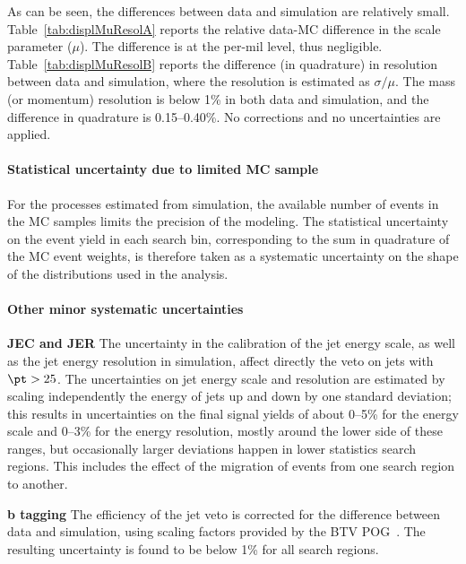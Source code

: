 As can be seen, the differences between data and simulation are
relatively small. Table~\ref{tab:displMuResolA} reports the relative
data-MC difference in the scale parameter ($\mu$). The difference is
at the per-mil level, thus negligible.
Table~\ref{tab:displMuResolB} reports the difference (in quadrature) in
resolution between data and simulation, where the resolution is
estimated as $\sigma/\mu$. The mass (or momentum) resolution is below
1\% in both data and simulation, and the difference in quadrature is
0.15--0.40\%. No corrections and no uncertainties are applied.

\paragraph{Statistical uncertainty due to limited MC sample}
For the processes estimated from simulation, the available number of
events in the MC samples limits the precision of the modeling.
The statistical uncertainty on the event yield in each search bin,
corresponding to the sum in quadrature of the MC event weights, is
therefore taken as a systematic uncertainty on the shape of the
distributions used in the analysis.



\paragraph{Other minor systematic uncertainties}
\textbf{JEC and JER}
The uncertainty in the calibration of the jet energy scale, as well
as the jet energy resolution in simulation, affect directly the veto
on \PQb jets with $\pt>25$\GeV.
The uncertainties on jet energy scale and resolution are estimated by
scaling independently the energy of jets up and down by one standard
deviation; this results in uncertainties on the final signal yields of about
0--5\% for the energy scale and 0--3\% for the energy resolution,
mostly around the lower side of these ranges, but occasionally larger
deviations happen in lower statistics search regions.
This includes the effect of the migration of events from one search
region to another.

\textbf{b tagging}
The efficiency of the \PQb jet veto is corrected for the difference
between data and simulation, using scaling factors provided by the BTV
POG~\cite{BTagCorr}.
The resulting uncertainty is found to
be below 1\% for all search regions.

